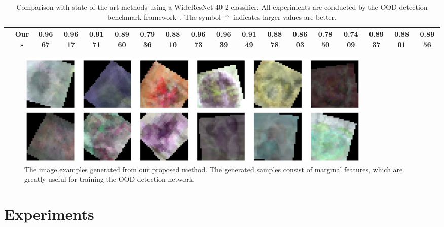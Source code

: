 \documentclass[letterpaper]{article} %
\begin{document}
\begin{table}[!ht]
\begin{adjustbox}{width=17.8cm,center}
\begin{tabular}{c|c|cccccccccccccc|cc}
  \cline{2-18}
 & Ours &\textbf{0.9667}&\textbf{0.9617}&0.9171	&0.8960	&0.7936	&0.8810	&0.9673	&0.9639	&0.9149	&0.8878	&0.8603	&0.7850&0.7409	&0.8937	&\textbf{0.8801}&\textbf{0.8956}\\ 
 \bottomrule
\end{tabular}
\end{adjustbox}
\caption{Comparison with state-of-the-art methods using a WideResNet-40-2 classifier. All experiments are conducted by the OOD detection benchmark framework~\cite{kirchheim2022pytorch}. The symbol $\uparrow$ indicates larger values are better.}
\label{tab:cifar10_table}
\end{table}
\vspace{-0.1cm}
\begin{figure}[h]
    \centering \centerline{\includegraphics[width=0.85\textwidth]{figures/mixup_augmentation.png}}
    \caption{The image examples generated from our proposed method. The generated samples consist of marginal features, which are greatly useful for training the OOD detection network.} 
    \label{fig:mixup_augmentation}
\end{figure}


\section{Experiments}
\vspace{-0.1cm}
\end{document}
